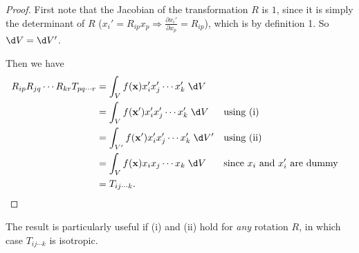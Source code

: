 \documentclass[a4paper]{article}
\begin{document}
\begin{proof}
  First note that the Jacobian of the transformation $R$ is $1$, since it is simply the determinant of $R$ ($x_i' = R_{ip}x_p \Rightarrow \frac{\partial x_i'}{\partial x_p} = R_{ip}$), which is by definition 1. So $\d V = \d V'$.

  Then we have
  \begin{align*}
    R_{ip}R_{jq}\cdots R_{kr} T_{pq\cdots r} &= \int_V f(\mathbf{x})x_i' x_j' \cdots x_k' \;\d V\\
    &= \int_V f(\mathbf{x}')x_i' x_j' \cdots x_k'\;\d V&&\text{using (i)}\\
    &= \int_{V'} f(\mathbf{x}') x_i' x_j' \cdots x_k' \;\d V'&&\text{using (ii)}\\
    &= \int_{V} f(\mathbf{x}) x_i x_j \cdots x_k \;\d V&&\text{since $x_i$ and $x_i'$ are dummy}\\
    &= T_{ij\cdots k}.\qedhere
  \end{align*}
\end{proof}

The result is particularly useful if (i) and (ii) hold for \emph{any} rotation $R$, in which case $T_{ij\cdots k}$ is isotropic.
\end{document}

